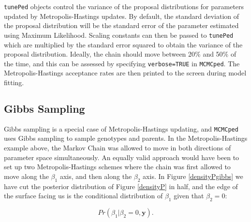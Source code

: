 \documentclass{article}
\begin{document}
\texttt{tunePed} objects control the variance of the proposal distributions for parameters updated by Metropolis-Hastings updates.  By default, the standard deviation of the proposal distribution will be the standard error of the parameter estimated using Maximum Likelihood.  Scaling constants can then be passed to \texttt{tunePed} which are multiplied by the standard error squared to obtain the variance of the proposal distribution.  Ideally, the chain should move between 20\% and 50\% of the time, and this can be assessed by specifying \texttt{verbose=TRUE} in \texttt{MCMCped}.  The Metropolis-Hastings acceptance rates are then printed to the screen during model fitting.
 
\subsection{Gibbs Sampling}

Gibbs sampling is a special case of Metropolis-Hastings updating, and \texttt{MCMCped} uses Gibbs sampling to sample genotypes and parents.  In the Metropolis-Hastings example above, the Markov Chain was allowed to move in both directions of parameter space simultaneously.  An equally valid approach would have been to set up two Metropolis-Hastings schemes where the chain was first allowed to move along the $\beta_{1}$ axis, and then along the $\beta_{2}$ axis. In Figure \ref{densityPgibbs} we have cut the posterior distribution of Figure \ref{densityP} in half, and the edge of the surface facing us is the conditional distribution of $\beta_{1}$ given that $\beta_{2}=0$: 

\begin{equation}
Pr(\beta_{1}|\beta_{2}=0, \bm{y}).
\end{equation}
\end{document}
